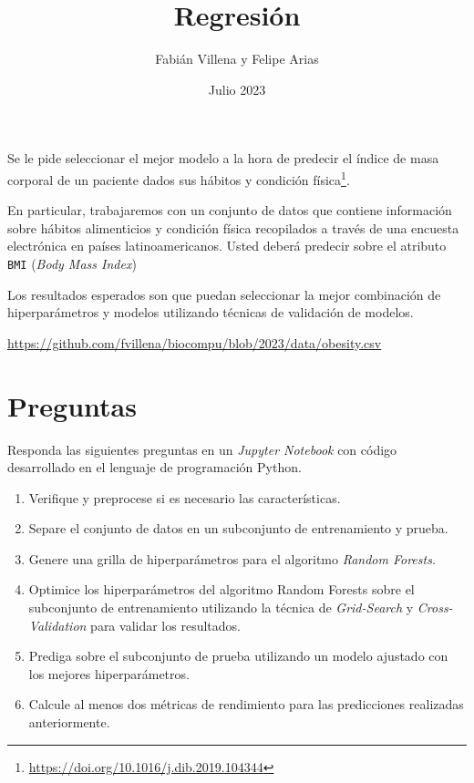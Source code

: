 \documentclass{article}
\title{Regresión}
\author{Fabián Villena y Felipe Arias}
\date{Julio 2023}
\begin{document}
\maketitle

Se le pide seleccionar el mejor modelo a la hora de predecir el índice de masa corporal de un paciente dados sus hábitos y condición física\footnote{\url{https://doi.org/10.1016/j.dib.2019.104344}}.

En particular, trabajaremos con un conjunto de datos que contiene información sobre hábitos alimenticios y condición física recopilados a través de una encuesta electrónica en países latinoamericanos. Usted deberá predecir sobre el atributo \texttt{BMI} (\textit{Body Mass Index})

Los resultados esperados son que puedan seleccionar la mejor combinación de hiperparámetros y modelos utilizando técnicas de validación de modelos. 

\begin{center}
    \url{https://github.com/fvillena/biocompu/blob/2023/data/obesity.csv}
\end{center}

\section*{Preguntas}

Responda las siguientes preguntas en un \textit{Jupyter Notebook} con código desarrollado en el lenguaje de programación Python.

\begin{enumerate}
	\item Verifique y preprocese si es necesario las características.
    \item Separe el conjunto de datos en un subconjunto de entrenamiento y prueba.
    \item Genere una grilla de hiperparámetros para el algoritmo \textit{Random Forests}.
    \item Optimice los hiperparámetros del algoritmo Random Forests sobre el subconjunto de entrenamiento utilizando la técnica de \textit{Grid-Search} y \textit{Cross-Validation} para validar los resultados.
    \item Prediga sobre el subconjunto de prueba utilizando un modelo ajustado con los mejores hiperparámetros.
    \item Calcule al menos dos métricas de rendimiento para las predicciones realizadas anteriormente.
\end{enumerate}
\end{document}
